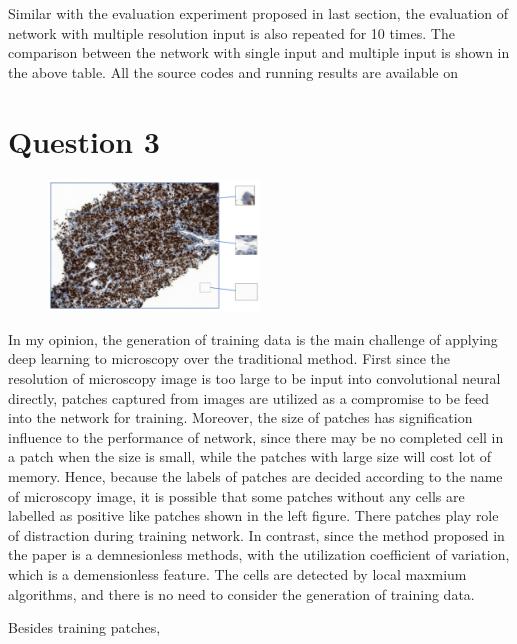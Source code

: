 \documentclass[UTF8]{article}
\begin{document}
Similar with the evaluation experiment proposed in last section,
the evaluation of network with multiple resolution input is also repeated for 10 times.
%
The comparison between the network with single input and multiple input is shown in the above table.
%
All the source codes and running results are available on 

\newpage

\section*{Question 3}
\begin{figure}
  \includegraphics[width=0.5\textwidth]{../imgs/test.pdf}
    \label{fig1}
\end{figure}
In my opinion,
the generation of training data is the main challenge of applying deep learning to microscopy over the traditional method.
%
First 
since the resolution of microscopy image is too large to be input into convolutional neural directly,
patches captured from images are utilized as a compromise to be feed into the network for training.
%
Moreover, the size of patches has signification influence to the performance of network,
since there may be no completed cell in a patch when the size is small,
while the patches with large size will cost lot of memory.
Hence, 
because the labels of patches are decided according to the name of microscopy image,
it is possible that some patches without any cells are labelled as positive like patches shown in the left figure.
%
There patches play role of distraction during training network.
%
In contrast, since the method proposed in the paper \cite{bigras2018new} is a demnesionless methods,
with the utilization coefficient of variation, which is a demensionless feature.
%
The cells are detected by local maxmium algorithms, 
and there is no need to consider the generation of training data.

Besides training patches,
\end{document}
